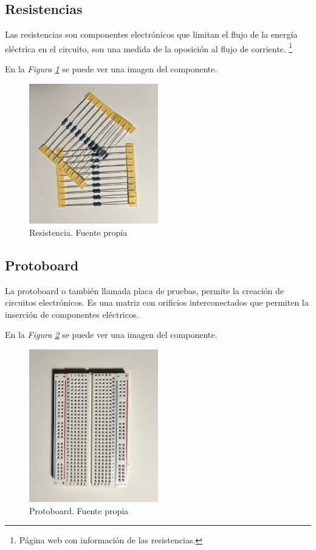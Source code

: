 \subsection{Resistencias}
Las resistencias son componentes electrónicos que limitan el flujo de la energía eléctrica en el circuito, son una medida de la oposición al flujo de corriente.  \cite{Resistencia}\footnote{Página web con información de las resistencias\cite{Resistencia}.}

En la \textit{Figura \ref{fig:Resistencias}} se puede ver una imagen del componente.
\begin{figure}[h]
        \centering
        \includegraphics[width=0.5\textwidth]{img/Resistencias.png}
        \caption{Resistencia. Fuente propia}
        \label{fig:Resistencias}
    \end{figure}
    
\subsection{Protoboard}
La protoboard o también llamada placa de pruebas, permite la creación de circuitos electrónicos. Es una matriz con orificios interconectados que permiten la inserción de componentes eléctricos. 

En la \textit{Figura \ref{fig:Protoboard} } se puede ver una imagen del componente.
\begin{figure}[h]
        \centering
        \includegraphics[angle=90,width=0.5\textwidth]{img/Protoboard.png}
        \caption{Protoboard. Fuente propia}
        \label{fig:Protoboard}
    \end{figure}

